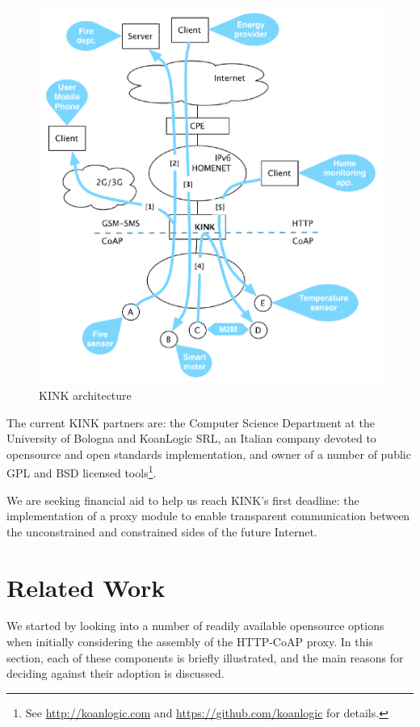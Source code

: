 \documentclass[12pt]{article}
\begin{document}
\begin{center}
    \begin{figure}
        \includegraphics[width=14cm]{../share/images/kink-homenet}
            \caption{KINK architecture}
            \label{fig:arch}
    \end{figure}
\end{center}

The current KINK partners are: the Computer Science Department at the University of Bologna and KoanLogic SRL, an Italian company devoted to \mbox{opensource} and open standards implementation, and owner of a number of public GPL and BSD licensed tools\footnote{See \href{http://koanlogic.com}{http://koanlogic.com} and \href{https://github.com/koanlogic}{https://github.com/koanlogic} for details.}.

We are seeking financial aid to help us reach KINK's first deadline: the implementation of a proxy module to enable transparent communication between the unconstrained and constrained sides of the future Internet.

\section{Related Work}
We started by looking into a number of readily available opensource options when initially considering the assembly of the HTTP-CoAP proxy.  In this section, each of these components is briefly illustrated, and the main reasons for deciding against their adoption is discussed.
\end{document}
